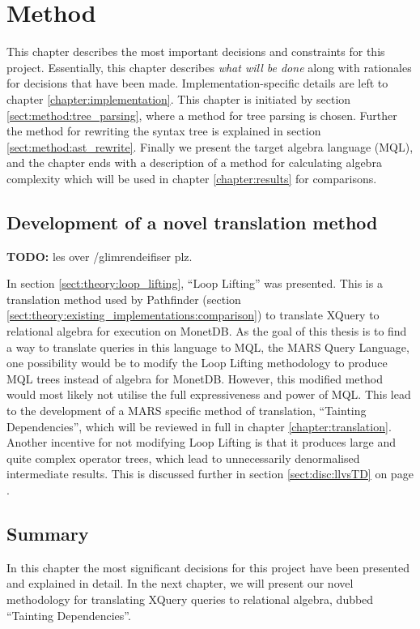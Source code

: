 \chapter{Method}
\label{chapter:method}
This chapter describes the most important decisions and constraints for this
project. Essentially, this chapter describes \emph{what will be done} along
with rationales for decisions that have been made. Implementation-specific
details are left to chapter \ref{chapter:implementation}. This chapter is
initiated by section \ref{sect:method:tree_parsing}, where a method for tree
parsing is chosen. Further the method for rewriting the syntax tree is
explained in section \ref{sect:method:ast_rewrite}. Finally we present the
target algebra language (MQL), and the chapter ends with a description of a
method for calculating algebra complexity which will be used in chapter
\ref{chapter:results} for comparisons.

\section{Development of a novel translation method}
\textbf{\LARGE TODO:} les over /glimrendeifiser plz.

In section \ref{sect:theory:loop_lifting}, ``Loop Lifting'' was presented. This
is a translation method used by Pathfinder (section
\ref{sect:theory:existing_implementations:comparison}) to translate XQuery to
relational algebra for execution on MonetDB. As the goal of this thesis is to
find a way to translate queries in this language to MQL, the MARS Query
Language, one possibility would be to modify the Loop Lifting methodology to
produce MQL trees instead of algebra for MonetDB. However, this modified
method would most likely not utilise the full expressiveness and power of MQL.
This lead to the development of a MARS specific method of translation,
``Tainting Dependencies'', which will be reviewed in full in chapter
\ref{chapter:translation}. Another incentive for not modifying Loop Lifting is
that it produces large and quite complex operator trees, which lead to
unnecessarily denormalised intermediate results. This is discussed further in
section \ref{sect:disc:llvsTD} on page \pageref{sect:disc:llvsTD}.







\section{Summary}
\label{sect:method:summary}
In this chapter the most significant decisions for this project have been
presented and explained in detail. In the next chapter, we will present our
novel methodology for translating XQuery queries to relational algebra, dubbed
``Tainting Dependencies''.
